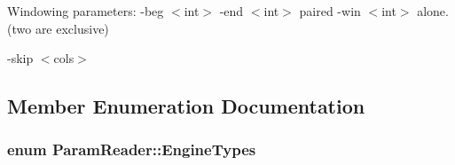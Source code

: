 Windowing parameters: -\/beg $<$int$>$ -\/end $<$int$>$ paired -\/win $<$int$>$ alone. (two are exclusive)

-\/skip $<$cols$>$ 

\subsection{Member Enumeration Documentation}
\hypertarget{classParamReader_ade771142042ad0251f905f38248ae9df}{
\subsubsection[{EngineTypes}]{\setlength{\rightskip}{0pt plus 5cm}enum {\bf ParamReader::EngineTypes}}}
\label{classParamReader_ade771142042ad0251f905f38248ae9df}
